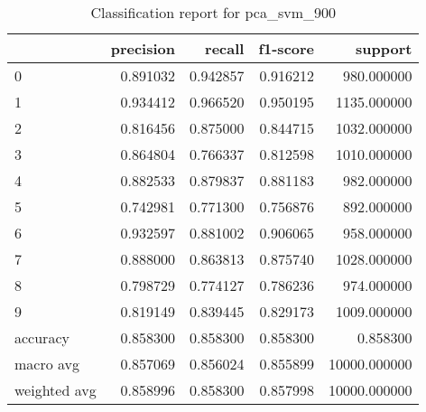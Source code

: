 \begin{table}[htb!]
\centering
\caption{Classification report for pca_svm_900}
\label{tab:classification-report-pca_svm_900}
\begin{tabular}{lrrrr}
\toprule
 & precision & recall & f1-score & support \\
\midrule
0 & 0.891032 & 0.942857 & 0.916212 & 980.000000 \\
1 & 0.934412 & 0.966520 & 0.950195 & 1135.000000 \\
2 & 0.816456 & 0.875000 & 0.844715 & 1032.000000 \\
3 & 0.864804 & 0.766337 & 0.812598 & 1010.000000 \\
4 & 0.882533 & 0.879837 & 0.881183 & 982.000000 \\
5 & 0.742981 & 0.771300 & 0.756876 & 892.000000 \\
6 & 0.932597 & 0.881002 & 0.906065 & 958.000000 \\
7 & 0.888000 & 0.863813 & 0.875740 & 1028.000000 \\
8 & 0.798729 & 0.774127 & 0.786236 & 974.000000 \\
9 & 0.819149 & 0.839445 & 0.829173 & 1009.000000 \\
accuracy & 0.858300 & 0.858300 & 0.858300 & 0.858300 \\
macro avg & 0.857069 & 0.856024 & 0.855899 & 10000.000000 \\
weighted avg & 0.858996 & 0.858300 & 0.857998 & 10000.000000 \\
\bottomrule
\end{tabular}
\end{table}
